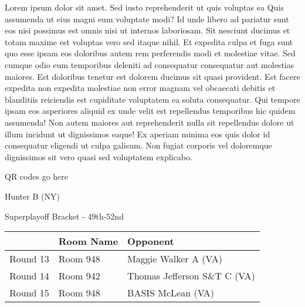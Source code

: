 \documentclass{article}%
\begin{document}
\vspace*{8pt}%
\linebreak%
\newline%
\newline%
Lorem ipsum dolor sit amet. Sed iusto reprehenderit ut quis voluptas ea Quis assumenda ut eius magni eum voluptate modi? Id unde libero ad pariatur sunt eos nisi possimus est omnis nisi ut internos laboriosam. Sit nesciunt ducimus et totam maxime est voluptas vero sed itaque nihil. Et expedita culpa et fuga sunt quo esse ipsam eos doloribus autem rem perferendis modi et molestiae vitae.\newline%
\newline%
Sed cumque odio eum temporibus deleniti ad consequatur consequatur aut molestias maiores. Est doloribus tenetur est dolorem ducimus sit quasi provident. Est facere expedita non expedita molestiae non error magnam vel obcaecati debitis et blanditiis reiciendis est cupiditate voluptatem ea soluta consequatur. Qui tempore ipsam eos asperiores aliquid ex unde velit est repellendus temporibus hic quidem assumenda!\newline%
\newline%
Non autem maiores aut reprehenderit nulla sit repellendus dolore ut illum incidunt ut dignissimos eaque! Ex aperiam minima eos quis dolor id consequatur eligendi ut culpa galisum. Non fugiat corporis vel doloremque dignissimos sit vero quasi sed voluptatem explicabo.\newline%
\newline%
%
\vspace*{30pt}%
\begin{center}%
\begin{Huge}%
QR codes go here%
\end{Huge}%
\end{center}%
\newpage%
\begin{center}%
\begin{Huge}%
Hunter B (NY)%
\end{Huge}%
\vspace*{8pt}%
\linebreak%
\begin{Large}%
Superplayoff Bracket {-} 49th{-}52nd%
\end{Large}%
\end{center}%
%
\begin{tabularx}{\textwidth}{|c|Y|Y|}%
\hline%
&Room Name&Opponent\\%
\hline%
Round 13&Room 948&Maggie Walker A (VA)\\%
Round 14&Room 942&Thomas Jefferson S\&T C (VA)\\%
Round 15&Room 948&BASIS McLean (VA)\\%
\hline%
\end{tabularx}%
\end{document}

